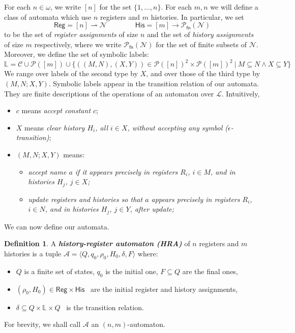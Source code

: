 \documentclass{article}
\theoremstyle{definition}
\newtheorem{definition}[theorem]{Definition}
\newcommand\boldemph[1]{\emph{\textbf{#1}}}
\renewcommand\AA{\mathcal{A}}
\newcommand\PP{\mathcal{P}}
\newcommand\PPfn{\mathcal{P}_{\!\mathsf{fn}}}
\newcommand\LL{\mathcal{L}}
\renewcommand\L{\mathbb{L}}
\newcommand\names{\mathcal{N}}
\newcommand\const{\mathcal{C}}
\newcommand\reg{\mathsf{Reg}}
\newcommand\his{\mathsf{His}}
\newcommand\img{\mathsf{img}}
\newcommand\dom{\mathsf{dom}}
\newcommand\ta{,}
\begin{document}
For each $n\in\omega$, we write $[n]$ for the set $\{1,\dots,n\}$.
For each $m,n$ we will define a class of automata which use $n$ registers and $m$ histories.
In particular, we set
\[ \reg = [n] \rightharpoonup \names\qquad\qquad \his=[m]\to\PPfn(\names) \]
to be the set of \emph{register assignments} of size $n$ and the set of \emph{history assignments} of size $m$ respectively, where
we write 
$\PPfn(\names)$ for the set of finite subsets of $\names$. 
%
Moreover, we define the set of symbolic labels:
\[
\L = \const\cup\PP([m])\cup \{((M,N),(X,Y))\in\PP([n])^2\times\PP([m])^2\ |\ M\subseteq N\land X\subseteq Y\}
\]
We range over labels of the second type by $X$, and over those of the third type by $(M\ta N;X\ta Y)$.
Symbolic labels appear in the transition relation of our automata. They are finite descriptions of the operations of an automaton over $\LL$. Intuitively,
\begin{itemize}
\item $c$ means \emph{accept constant $c$};
\item $X$ means \emph{clear history $H_i$, all $i\in X$, without accepting any symbol ($\epsilon$-transition)};
\item $(M\ta N;X\ta Y)$ means:
\begin{itemize}
 \item \emph{accept name $a$ if it appears precisely in registers $R_i$, $i\in M$, and in histories $H_j$, $j\in X$;}
 \item \emph{update registers and histories so that $a$ appears precisely in registers $R_i$, $i\in N$, and in histories $H_j$, $j\in Y$, after update;}
\end{itemize}
\end{itemize}
We can now define our automata.

\begin{definition}
A \boldemph{history-register automaton (HRA)} of $n$ registers and $m$ histories is a tuple $\AA=\langle Q,q_0,\rho_0,H_0,\delta,F\rangle$ where:
\begin{itemize}
\item $Q$ is a finite set of states, $q_0$ is the initial one, $F\subseteq Q$ are the final ones,
\item $(\rho_0,H_0)\in\reg\times\his$ \ are the initial register and history assignments,
\item $\delta\subseteq Q\times\L\times Q$ \ is the transition relation.
\end{itemize}
For brevity, we shall call $\AA$ an $(n,m)$-automaton.
\end{definition}
\end{document}
